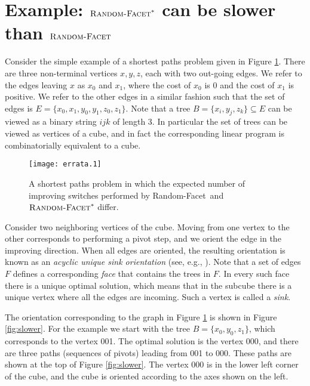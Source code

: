 \documentclass[twoside,11pt]{article}
\newcommand{\RandomFacet}{\mbox{\sc Random-}\allowbreak\mbox{\sc Facet}}
\begin{document}
\section{Example: $\RandomFacet^*$ can be slower than $\RandomFacet$}\label{sec:slower}

Consider the simple example of a shortest paths problem given in Figure \ref{fig:example}. There are three non-terminal vertices $x,y,z$, each with two out-going edges. We refer to the edges leaving $x$ as $x_0$ and $x_1$, where the cost of $x_0$ is 0 and the cost of $x_1$ is positive. We refer to the other edges in a similar fashion such that the set of edges is $E = \{x_0,x_1,y_0,y_1,z_0,z_1\}$. Note that a tree $B = \{x_i,y_j,z_k\} \subseteq E$ can be viewed as a binary string $ijk$ of length 3. In particular the set of trees can be viewed as vertices of a cube, and in fact the corresponding linear program is combinatorially equivalent to a cube.

\begin{figure}[t]
\begin{center}
\texttt{[image: errata.1]}
\end{center}
\caption{A shortest paths problem in which the expected number of improving switches performed by \RandomFacet\ and $\RandomFacet^*$ differ.}\label{fig:example}
\end{figure}

Consider two neighboring vertices of the cube. Moving from one vertex to the other corresponds to performing a pivot step, and we orient the edge in the improving direction. When all edges are oriented, the resulting orientation is known as an \emph{acyclic unique sink orientation} (see, e.g., \cite{SzWe01}). Note that a set of edges $F$ defines a corresponding \emph{face} that contains the trees in $F$. In every such face there is a unique optimal solution, which means that in the subcube there is a unique vertex where all the edges are incoming. Such a vertex is called a \emph{sink}.

The orientation corresponding to the graph in Figure \ref{fig:example} is shown in Figure \ref{fig:slower}. For the example we start with the tree $B=\{x_0,y_0,z_1\}$, which corresponds to the vertex 001. The optimal solution is the vertex 000, and there are three paths (sequences of pivots) leading from 001 to 000. These paths are shown at the top of Figure \ref{fig:slower}. The vertex 000 is in the lower left corner of the cube, and the cube is oriented according to the axes shown on the left.
\end{document}
